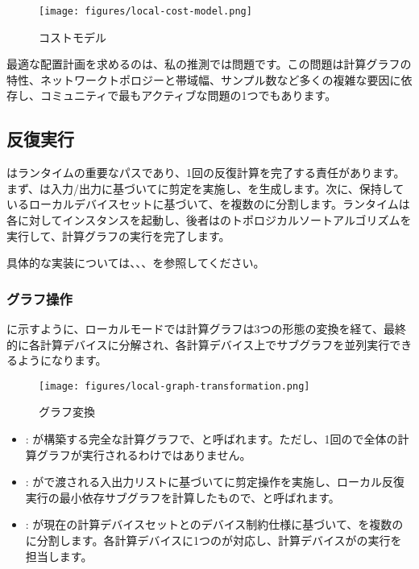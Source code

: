 \begin{content}
\begin{figure}[H]
\centering
\texttt{[image: figures/local-cost-model.png]}
\caption{コストモデル}
 \label{fig:local-cost-model}
\end{figure}

最適な配置計画を求めるのは、私の推測では問題です。この問題は計算グラフの特性、ネットワークトポロジーと帯域幅、サンプル数など多くの複雑な要因に依存し、コミュニティで最もアクティブな問題の1つでもあります。

\subsection{反復実行}

は\tf{}ランタイムの重要なパスであり、1回の反復計算を完了する責任があります。まず、は入力/出力に基づいてに剪定を実施し、を生成します。次に、保持しているローカルデバイスセットに基づいて、を複数のに分割します。ランタイムは各に対してインスタンスを起動し、後者はのトポロジカルソートアルゴリズムを実行して、計算グラフの実行を完了します。

具体的な実装については、、、を参照してください。

\subsubsection{グラフ操作}

に示すように、ローカルモードでは計算グラフは3つの形態の変換を経て、最終的に各計算デバイスに分解され、各計算デバイス上でサブグラフを並列実行できるようになります。

\begin{figure}[H]
\centering
\texttt{[image: figures/local-graph-transformation.png]}
\caption{グラフ変換}
 \label{fig:local-graph-transformation}
\end{figure}

\begin{itemize}
  \item {}: が構築する完全な計算グラフで、と呼ばれます。ただし、1回ので全体の計算グラフが実行されるわけではありません。
  \item {}: がで渡される入出力リストに基づいてに剪定操作を実施し、ローカル反復実行の最小依存サブグラフを計算したもので、と呼ばれます。
  \item {}: が現在の計算デバイスセットとのデバイス制約仕様に基づいて、を複数のに分割します。各計算デバイスに1つのが対応し、計算デバイスがの実行を担当します。
\end{itemize}


\end{content}
